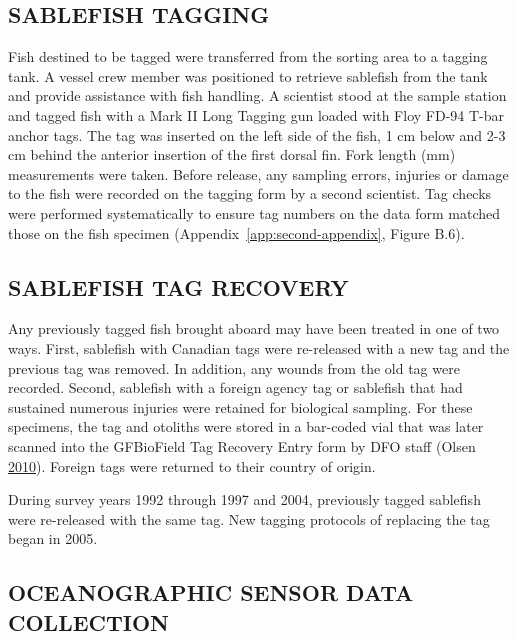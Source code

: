 \documentclass[12pt]{article}\usepackage[]{graphicx}\usepackage[]{color}
\begin{document}
\hypertarget{sablefish-tagging}{%
\subsection{SABLEFISH TAGGING}\label{sablefish-tagging}}

Fish destined to be tagged were transferred from the sorting area to a tagging tank. A vessel crew member was positioned to retrieve sablefish from the tank and provide assistance with fish handling. A scientist stood at the sample station and tagged fish with a Mark II Long Tagging gun loaded with Floy FD-94 T-bar anchor tags. The tag was inserted on the left side of the fish, 1 cm below and 2-3 cm behind the anterior insertion of the first dorsal fin. Fork length (mm) measurements were taken. Before release, any sampling errors, injuries or damage to the fish were recorded on the tagging form by a second scientist. Tag checks were performed systematically to ensure tag numbers on the data form matched those on the fish specimen (Appendix~\ref{app:second-appendix}, Figure B.6).

\hypertarget{sablefish-tag-recovery}{%
\subsection{SABLEFISH TAG RECOVERY}\label{sablefish-tag-recovery}}

Any previously tagged fish brought aboard may have been treated in one of two ways. First, sablefish with Canadian tags were re-released with a new tag and the previous tag was removed. In addition, any wounds from the old tag were recorded. Second, sablefish with a foreign agency tag or sablefish that had sustained numerous injuries were retained for biological sampling. For these specimens, the tag and otoliths were stored in a bar-coded vial that was later scanned into the GFBioField Tag Recovery Entry form by DFO staff (Olsen \protect\hyperlink{ref-Olsen2010}{2010}). Foreign tags were returned to their country of origin.

During survey years 1992 through 1997 and 2004, previously tagged sablefish were re-released with the same tag. New tagging protocols of replacing the tag began in 2005.

\hypertarget{oceanographic-sensor-data-collection}{%
\subsection{OCEANOGRAPHIC SENSOR DATA COLLECTION}\label{oceanographic-sensor-data-collection}}
\end{document}
